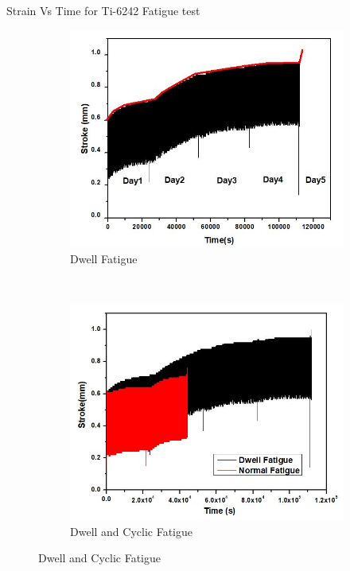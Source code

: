 \documentclass[10pt]{beamer}
\begin{document}
\begin{frame}{Strain Vs Time for Ti-6242 Fatigue test}

\begin{figure}[H]
    \centering
    \begin{subfigure}{0.40\textwidth}
        \includegraphics[width=\textwidth]{images/Dwell.JPG}
        \caption{Dwell Fatigue}
    \end{subfigure}
    \\
    \begin{subfigure}{0.40\textwidth}
        \includegraphics[width=\textwidth]{images/Dwell and cyclic.JPG}
        \caption{Dwell and Cyclic Fatigue}
    \end{subfigure}    
\end{figure}

\end{frame}
\end{document}
